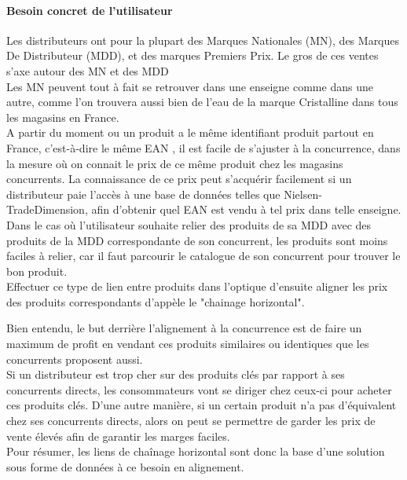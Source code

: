 \documentclass{rapportCS}
\begin{document}
\paragraph{Besoin concret de l'utilisateur}
Les distributeurs ont pour la plupart des Marques Nationales (MN), des Marques De Distributeur (MDD), et des marques Premiers Prix.
Le gros de ces ventes s'axe autour des MN et des MDD \\
Les MN peuvent tout à fait se retrouver dans une enseigne comme dans une autre, comme l'on
trouvera aussi bien de l'eau de la marque Cristalline dans tous les magasins en France. \\
A partir du moment ou un produit a le même identifiant produit partout en France, c'est-à-dire
le même EAN%
, il est facile de s'ajuster à la concurrence, dans la mesure où on connait le prix de
ce même produit chez les magasins concurrents. 
La connaissance de ce prix peut s'acquérir facilement si un distributeur paie l'accès à une base
de données telles que Nielsen-TradeDimension, afin d'obtenir quel EAN est vendu à tel prix dans telle enseigne.\\

Dans le cas où l'utilisateur souhaite relier des produits de sa MDD avec des produits de la MDD correspondante
de son concurrent, les produits sont moins faciles à relier, car il faut parcourir le catalogue de son
concurrent pour trouver le bon produit.\\

Effectuer ce type de lien entre produits dans l'optique d'ensuite aligner les prix des produits
correspondants d'appèle le "chainage horizontal".

Bien entendu, le but derrière l'alignement à la concurrence est de faire un
maximum de profit en vendant ces produits similaires ou identiques que les concurrents
proposent aussi. \\
Si un distributeur est trop cher sur des produits clés par rapport à ses concurrents directs,
les consommateurs vont se diriger chez ceux-ci pour acheter ces produits clés. 
D'une autre manière, si un certain produit n'a pas d'équivalent chez ses concurrents directs,
alors on peut se permettre de garder les prix de vente élevés afin de garantir les marges faciles. \\
Pour résumer, les liens de chaînage horizontal sont donc la base d'une solution sous forme de données 
à ce besoin en alignement.\\
\end{document}
